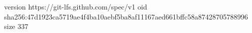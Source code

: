 version https://git-lfs.github.com/spec/v1
oid sha256:47d1923ca5719ae4f4ba10aebf5ba8af11167aed661bffc58a87428705788996
size 337
